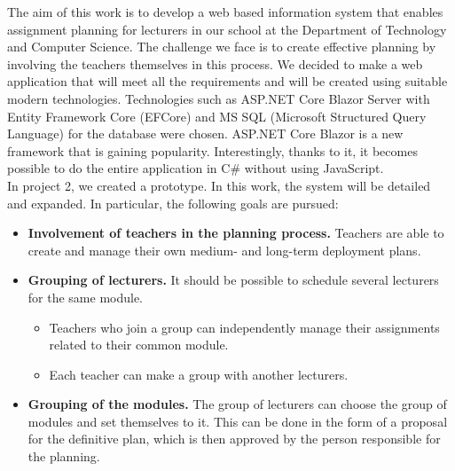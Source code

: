 \documentclass{scrartcl}
\begin{document}
The aim of this work is to develop a web based information system that enables assignment planning for lecturers in our school at the Department of Technology and Computer Science.
The challenge we face is to create effective planning by involving the teachers themselves in this process. We decided to make a web application that will meet all the requirements and will be created using suitable modern technologies. Technologies such as ASP.NET Core Blazor Server with Entity Framework Core (EFCore) and MS SQL (Microsoft Structured Query Language) for the database were chosen. ASP.NET Core Blazor is a new framework that is gaining popularity. Interestingly, thanks to it, it becomes possible to do the entire application in C\# without using JavaScript.\\

In project 2, we created a prototype. In this work, the system will be detailed and expanded. In particular, the following goals are pursued:
\begin{itemize}
\item \textbf{Involvement of teachers in the planning process.}
Teachers are able to create and manage their own medium- and long-term deployment plans.
\item \textbf{Grouping of lecturers.} It should be possible to schedule several lecturers for the same module.
   \begin{itemize}
   \item Teachers who join a group can independently manage their assignments related to their common module.
   \item Each teacher can make a group with another lecturers.
   \end{itemize}
 \item \textbf{Grouping of the modules.} The group of lecturers can  choose the group of modules and set themselves to it. This can be done in the form of a proposal for the definitive plan, which is then approved by the person responsible for the planning.
\end{itemize}




%
\end{document}
